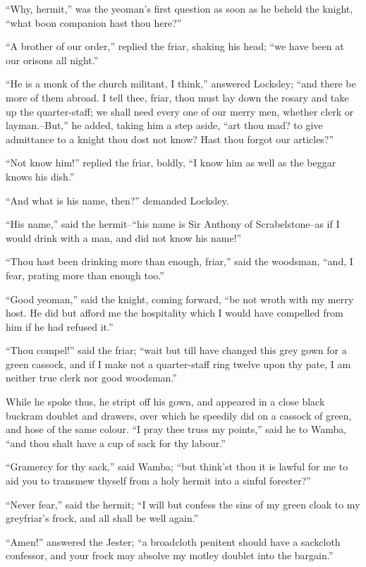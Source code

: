 ``Why, hermit,'' was the yeoman's first question as soon as he beheld
the knight, ``what boon companion hast thou here?''

``A brother of our order,'' replied the friar, shaking his head; ``we
have been at our orisons all night.''

``He is a monk of the church militant, I think,'' answered Locksley;
``and there be more of them abroad. I tell thee, friar, thou must lay
down the rosary and take up the quarter-staff; we shall need every one
of our merry men, whether clerk or layman.--But,'' he added, taking him
a step aside, ``art thou mad? to give admittance to a knight thou dost
not know? Hast thou forgot our articles?''

``Not know him!'' replied the friar, boldly, ``I know him as well as the
beggar knows his dish.''

``And what is his name, then?'' demanded Locksley.

``His name,'' said the hermit--``his name is Sir Anthony of
Scrabelstone--as if I would drink with a man, and did not know his
name!''

``Thou hast been drinking more than enough, friar,'' said the woodsman,
``and, I fear, prating more than enough too.''

``Good yeoman,'' said the knight, coming forward, ``be not wroth with my
merry host. He did but afford me the hospitality which I would have
compelled from him if he had refused it.''

``Thou compel!'' said the friar; ``wait but till have changed this grey
gown for a green cassock, and if I make not a quarter-staff ring twelve
upon thy pate, I am neither true clerk nor good woodsman.''

While he spoke thus, he stript off his gown, and appeared in a close
black buckram doublet and drawers, over which he speedily did on a
cassock of green, and hose of the same colour. ``I pray thee truss my
points,'' said he to Wamba, ``and thou shalt have a cup of sack for thy
labour.''

``Gramercy for thy sack,'' said Wamba; ``but think'st thou it is lawful
for me to aid you to transmew thyself from a holy hermit into a sinful
forester?''

``Never fear,'' said the hermit; ``I will but confess the sins of my
green cloak to my greyfriar's frock, and all shall be well again.''

``Amen!'' answered the Jester; ``a broadcloth penitent should have a
sackcloth confessor, and your frock may absolve my motley doublet into
the bargain.''

